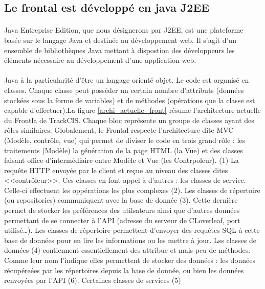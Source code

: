 		\subsection{Le frontal est développé en java J2EE}
			\paragraph{}%
			Java Entreprise Edition, que nous désignerons par J2EE, est une
			plateforme basée sur le langage Java et destinée au développement web. Il
			s'agit d'un ensemble de bibliothèques Java mettant à dispostion des
			développeurs les éléments nécessaire au développement d'une application
			web.
			
			\paragraph{}
			Java à la particularité d'être un langage orienté objet. Le code est organisé
			en classes. Chaque classe peut possèder un certain nombre d'attributs
			(données stockées sous la forme de variables) et de méthodes (opérations
			que la classe est capable d'effectuer).La figure \ref{archi_actuelle_front}
			résume l'architecture actuelle du Frontla de TrackCIS. Chaque bloc représente
			un groupe de classes ayant des rôles similaires. Globalement, le Frontal
			respecte l'architecture dite MVC (Modèle, contrôle, vue) qui permet de
			diviser le code en trois grand rôle : les traitements (Modèle) la génération
			de la page HTML (la Vue) et des classes faisant office d'intermédiaire entre
			Modèle et Vue (les Contrpoleur). (1) La requête HTTP envoyée par le client et
			reçue au niveau des classes dites <<contrôleur>>. Ces classes en font appel
			à d'autres : les classes de service. Celle-ci effectuent les oppérations les
			plus complexes (2). Les classes de répertoire (ou repositories) communiquent
			avec la base de donnée (3). Cette dernière permet de stocker les préférences
			des utilsateurs ainsi que d'autres données permettant de se connecter à
			l'API (adresse du serveur de CLoverleaf, port utilisé\ldots). Les classes de
			répertoire permettent d'envoyer des requêtes SQL à cette base de données
			pour en lire les informations ou les mettre à jour. Lss classes de données
			(4) contiennent essentiellement des attribue et mais peu de méthodes. Comme
			leur nom l'indique elles permettent de stocker des données : les données
			récupéreées par les répertoires depuis la base de donnée, ou bien les
			données renvoyées par l'API (6). Certaines classes de services (5)
